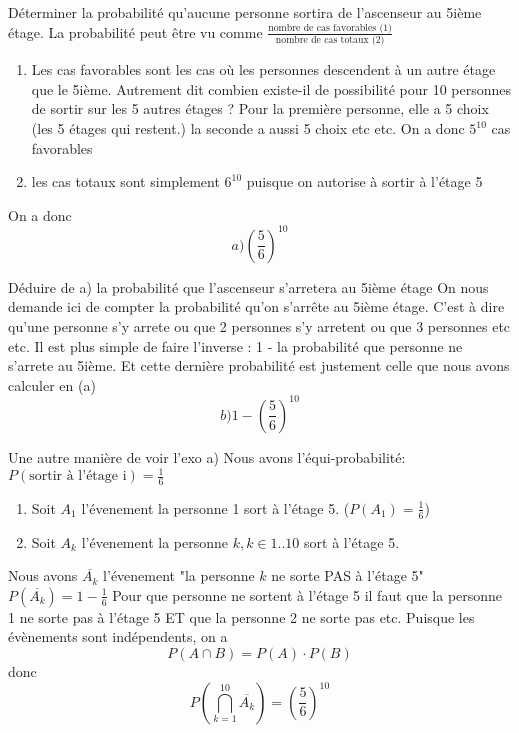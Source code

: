\begin{exo}
  \begin{subexo} {Déterminer la probabilité qu’aucune personne sortira de l’ascenseur au 5ième étage.}
    La probabilité peut être vu comme $\frac{\text{nombre de cas favorables (1)}}{\text{nombre de cas totaux (2)}}$

      \begin{enumerate}[label=(\arabic*)]
        \item Les cas favorables sont les cas où les personnes descendent à un autre étage que le 5ième.
        Autrement dit combien existe-il de possibilité pour 10 personnes de sortir sur les 5 autres étages ?
        Pour la première personne, elle a 5 choix (les 5 étages qui restent.) la seconde a aussi 5 choix etc etc.
        On a donc $5^{10}$ cas favorables
        \item les cas totaux sont simplement $6^{10}$ puisque on autorise à sortir à l'étage 5
      \end{enumerate}
      On a donc $$a) \left(\frac{5}{6}\right)^{10}$$

  \end{subexo}
  \begin{subexo}{Déduire de a) la probabilité que l'ascenseur s'arretera au 5ième étage}
      On nous demande ici de compter la probabilité qu'on s'arrête au 5ième étage. C'est à dire qu'une personne s'y arrete ou que 2 personnes s'y arretent ou que 3 personnes etc etc.
    Il est plus simple de faire l'inverse : 1 - la probabilité que personne ne s'arrete au 5ième. Et cette dernière probabilité est justement celle que nous avons calculer en (a)
    $$b)1 - \left( \dfrac{5}{6} \right)^{10}$$
    \end{subexo}
  \begin{subexo}{Une autre manière de voir l'exo a)}
    Nous avons l'équi-probabilité: $ P({\text{sortir à l'étage i}}) = \frac{1}{6}$
    \begin{enumerate}
      \item 			Soit $A_1$ l'évenement la personne 1 sort à l'étage 5. ($P(A_1) = \frac{1}{6}$)
\item 			Soit $A_k$ l'évenement la personne $k, k\in 1..10$ sort à l'étage 5.

    \end{enumerate}
    Nous avons $\overline{A_k}$ l'évenement "la personne $k$ ne sorte PAS à l'étage 5" $P(\overline{A_k}) = 1 -\frac{1}{6}$
    Pour que personne ne sortent à l'étage 5 il faut que la personne 1 ne sorte pas à l'étage 5 ET que la personne 2 ne sorte pas etc.
    \newline
    Puisque les évènements sont indépendents, on a $$P(A \cap B) =P(A) \cdot{ P(B)} $$
    donc $$ P\left( \bigcap_{k=1}^{10}\overline{A_{k}}\right) = \left(\frac{5}{6}\right)^{10}$$
  \end{subexo}
\end{exo}
